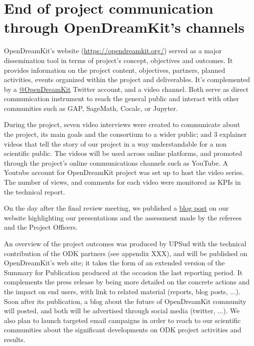 \documentclass{deliverablereport}
\begin{document}

\section{End of project communication through OpenDreamKit's channels}

OpenDreamKit's website (\url{https://opendreamkit.org/}) served as a
major dissemination tool in terms of project’s concept, objectives and
outcomes. It provides information on the project content, objectives,
partners, planned activities, events organized within the project and
deliverables. It's complemented by a
\href{https://twitter.com/OpenDreamKit}{@OpenDreamKit} Twitter
account, and a video channel. Both serve as direct communication
instrument to reach the general public and interact with other
communities such as GAP, SageMath, Cocalc, or Jupyter.

During the project, seven video interviews were created to communicate
about the project, its main goals and the consortium to a wider
public; and 3 explainer videos that tell the story of our project in a
way understandable for a non scientific public. The videos will be
used across online platforms, and promoted through the project’s
online communications channels such as YouTube. A Youtube account for
OpenDreamKit project was set up to host the video series. The number
of views, and comments for each video were monitored as KPIs in the
technical report.

On the day after the final review meeting, we published a
\href{https://opendreamkit.org/2019/10/30/final-project-review/}{blog post}
on our website highlighting our presentations and the assessment made
by the referees and the Project Officers.

An overview of the project outcomes was produced by UPSud with the
technical contribution of the ODK partners (see appendix XXX), and
will be published on OpenDreamKit's web site; it takes the form of an
extended version of the Summary for Publication produced at the
occasion the last reporting period. It complements the press release
by being more detailed on the concrete actions and the impact on end
users, with link to related material (reports, blog posts, ...). Soon
after its publication, a blog about the future of OpenDreamKit
community will posted, and both will be advertised through social
media (twitter, ...). We also plan to launch targeted email campaigns
in order to reach to our scientific communities about the significant
developments on ODK project activities and results.
\end{document}
